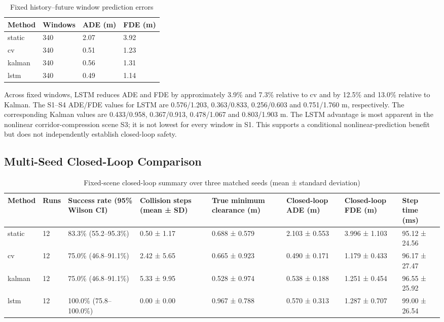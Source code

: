 \documentclass[10pt,a4paper]{article}
\begin{document}
\begin{table}[t]
\centering
\small
\caption{Fixed history–future window prediction errors}
\label{tab:table-2}
\begin{tabularx}{\linewidth}{YYYY}
\toprule
Method & Windows & ADE (m) & FDE (m) \\
\midrule
static & 340 & 2.07 & 3.92 \\
cv & 340 & 0.51 & 1.23 \\
kalman & 340 & 0.56 & 1.31 \\
lstm & 340 & 0.49 & 1.14 \\
\bottomrule
\end{tabularx}
\end{table}

Across fixed windows, LSTM reduces ADE and FDE by approximately 3.9\% and 7.3\% relative to cv and by 12.5\% and 13.0\% relative to Kalman. The S1–S4 ADE/FDE values for LSTM are 0.576/1.203, 0.363/0.833, 0.256/0.603 and 0.751/1.760 m, respectively. The corresponding Kalman values are 0.433/0.958, 0.367/0.913, 0.478/1.067 and 0.803/1.903 m. The LSTM advantage is most apparent in the nonlinear corridor-compression scene S3; it is not lowest for every window in S1. This supports a conditional nonlinear-prediction benefit but does not independently establish closed-loop safety.

\subsection{Multi-Seed Closed-Loop Comparison}

\begin{table}[t]
\centering
\small
\caption{Fixed-scene closed-loop summary over three matched seeds (mean ± standard deviation)}
\label{tab:table-3}
\begin{tabularx}{\linewidth}{YYYYYYYY}
\toprule
Method & Runs & Success rate (95\% Wilson CI) & Collision steps (mean ± SD) & True minimum clearance (m) & Closed-loop ADE (m) & Closed-loop FDE (m) & Step time (ms) \\
\midrule
static & 12 & 83.3\% (55.2–95.3\%) & 0.50 ± 1.17 & 0.688 ± 0.579 & 2.103 ± 0.553 & 3.996 ± 1.103 & 95.12 ± 24.56 \\
cv & 12 & 75.0\% (46.8–91.1\%) & 2.42 ± 5.65 & 0.665 ± 0.923 & 0.490 ± 0.171 & 1.179 ± 0.433 & 96.17 ± 27.47 \\
kalman & 12 & 75.0\% (46.8–91.1\%) & 5.33 ± 9.95 & 0.528 ± 0.974 & 0.538 ± 0.188 & 1.251 ± 0.454 & 96.55 ± 25.92 \\
lstm & 12 & 100.0\% (75.8–100.0\%) & 0.00 ± 0.00 & 0.967 ± 0.788 & 0.570 ± 0.313 & 1.287 ± 0.707 & 99.00 ± 26.54 \\
\bottomrule
\end{tabularx}
\end{table}
\end{document}
